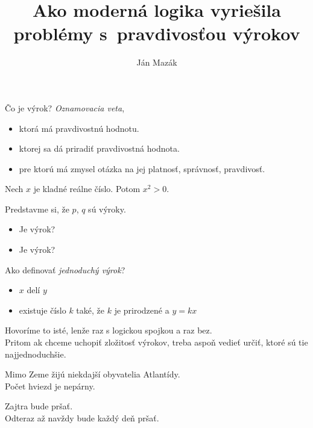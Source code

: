 \documentclass[12pt]{beamer}
\theoremstyle{definition}
\begin{document}
	\title{Ako moderná logika vyriešila problémy s~pravdivosťou výrokov}
	\author{Ján Mazák}
	\frame{\titlepage}

\begin{frame}
Čo je výrok? \emph{Oznamovacia veta},
\begin{itemize}
	\item ktorá má pravdivostnú hodnotu.
	\item ktorej sa dá priradiť pravdivostná hodnota.
	\item pre ktorú má zmysel otázka na jej platnosť, správnosť, pravdivosť.
\end{itemize}
\end{frame}

\begin{frame}
Nech $x$ je kladné reálne číslo. Potom $x^2 > 0$.
\end{frame}

\begin{frame}
Predstavme si, že $p$, $q$ sú výroky.
\begin{itemize}
	\item Je  výrok?
	\item Je  výrok?
\end{itemize}
\end{frame}

\begin{frame}
Ako definovať \emph{jednoduchý výrok}? 
\begin{itemize}
	\item $x$ delí $y$
	\item existuje číslo $k$ také, že $k$ je prirodzené a $y = kx$
\end{itemize}
Hovoríme to isté, lenže raz s logickou spojkou a raz bez.\\

Pritom ak chceme uchopiť zložitosť výrokov, treba aspoň vedieť určiť, ktoré sú tie najjednoduchšie.
\end{frame}

\begin{frame}
Mimo Zeme žijú niekdajší obyvatelia Atlantídy.\\[5mm]
Počet hviezd je nepárny.
\end{frame}

\begin{frame}
Zajtra bude pršať.\\[5mm]
\pause
Odteraz až navždy bude každý deň pršať.
\end{frame}
\end{document}
